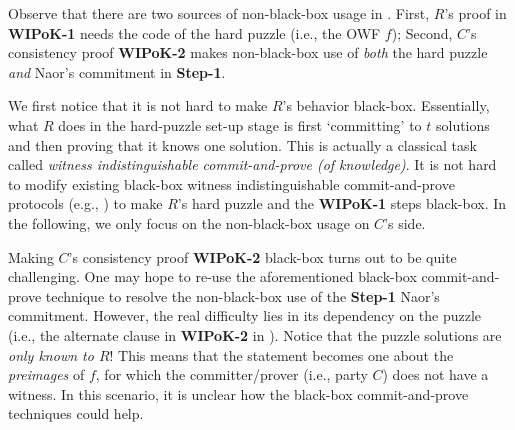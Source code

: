 Observe that there are two sources of non-black-box usage in . First, $R$'s proof in {\bf WIPoK-1} needs the code of the hard puzzle (i.e., the OWF $f$); Second, $C$'s consistency proof {\bf WIPoK-2} makes non-black-box use of {\em both} the hard puzzle {\em and} Naor's commitment in {\bf Step-1}.

We first notice that it is not hard to make $R$'s behavior black-box. Essentially, what $R$ does in the hard-puzzle set-up stage is first `committing' to $t$ solutions and then proving that it knows one solution. This is actually a classical task called {\em witness indistinguishable commit-and-prove (of knowledge)}. It is not hard to modify existing black-box witness indistinguishable commit-and-prove protocols (e.g., \cite{C:CCLY22}) to make $R$'s hard puzzle and the {\bf WIPoK-1} steps black-box. In the following, we only focus on the non-black-box usage on $C$'s side. 


Making $C$'s consistency proof {\bf WIPoK-2} black-box turns out to be quite challenging. One may hope to re-use the aforementioned black-box commit-and-prove technique to resolve the non-black-box use of the {\bf Step-1} Naor's commitment. However, the real difficulty lies in its dependency on the puzzle (i.e., the alternate clause in {\bf WIPoK-2} in ). Notice that the puzzle solutions are {\em only known to $R$}! This means that the statement becomes one about the {\em preimages} of $f$, for which the committer/prover (i.e., party $C$) does not have a witness.  In this scenario, it is unclear how the black-box commit-and-prove techniques could help. 

